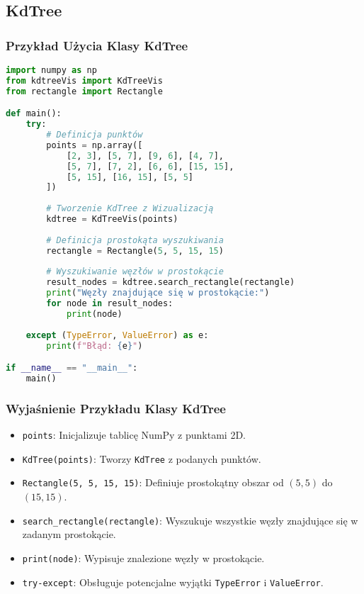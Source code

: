 \documentclass[12pt]{article}
\begin{document}
\subsection{KdTree}

\subsubsection{Przykład Użycia Klasy KdTree}

\begin{lstlisting}[language=Python, caption=Przykład użycia klasy KdTree, style=examplestyle]
import numpy as np
from kdtreeVis import KdTreeVis
from rectangle import Rectangle

def main():
    try:
        # Definicja punktów
        points = np.array([
            [2, 3], [5, 7], [9, 6], [4, 7],
            [5, 7], [7, 2], [6, 6], [15, 15],
            [5, 15], [16, 15], [5, 5]
        ])
        
        # Tworzenie KdTree z Wizualizacją
        kdtree = KdTreeVis(points)
        
        # Definicja prostokąta wyszukiwania
        rectangle = Rectangle(5, 5, 15, 15)
        
        # Wyszukiwanie węzłów w prostokącie
        result_nodes = kdtree.search_rectangle(rectangle)
        print("Węzły znajdujące się w prostokącie:")
        for node in result_nodes:
            print(node)
        
    except (TypeError, ValueError) as e:
        print(f"Błąd: {e}")

if __name__ == "__main__":
    main()
\end{lstlisting}

\subsubsection{Wyjaśnienie Przykładu Klasy KdTree}

\begin{itemize}
    \item \texttt{points}: Inicjalizuje tablicę NumPy z punktami 2D.
    \item \texttt{KdTree(points)}: Tworzy \texttt{KdTree} z podanych punktów.
    \item \texttt{Rectangle(5, 5, 15, 15)}: Definiuje prostokątny obszar od \((5,5)\) do \((15,15)\).
    \item \texttt{search\_rectangle(rectangle)}: Wyszukuje wszystkie węzły znajdujące się w zadanym prostokącie.
    \item \texttt{print(node)}: Wypisuje znalezione węzły w prostokącie.
    \item \texttt{try-except}: Obsługuje potencjalne wyjątki \texttt{TypeError} i \texttt{ValueError}.
\end{itemize}
\end{document}
